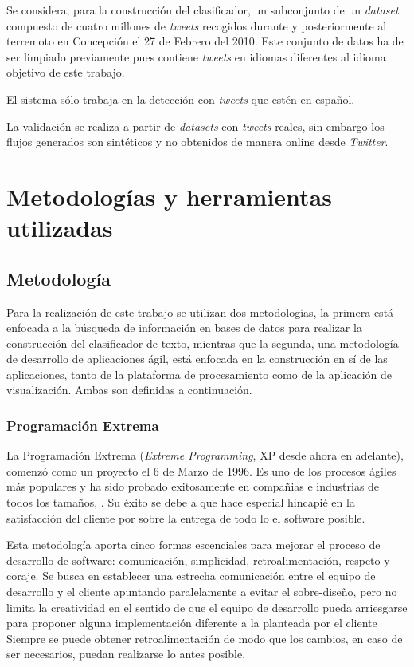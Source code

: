 Se considera, para la construcción del clasificador, un subconjunto de un \textit{dataset} compuesto de cuatro millones de \textit{tweets} recogidos durante y posteriormente al terremoto en Concepción el 27 de Febrero del 2010. Este conjunto de datos ha de ser limpiado previamente pues contiene \textit{tweets} en idiomas diferentes al idioma objetivo de este trabajo.

El sistema sólo trabaja en la detección con \textit{tweets} que estén en español.

La validación se realiza a partir de \textit{datasets} con \textit{tweets} reales, sin embargo los flujos generados son sintéticos y no obtenidos de manera online desde \textit{Twitter}.

\section{Metodologías y herramientas utilizadas}
\label{intro:metodologia}

\subsection{Metodología}
\label{subsec:MetodologiaDetalle}

Para la realización de este trabajo se utilizan dos metodologías, la primera está enfocada a la búsqueda de información en bases de datos para realizar la construcción del clasificador de texto, mientras que la segunda, una metodología de desarrollo de aplicaciones ágil, está enfocada en la construcción en sí de las aplicaciones, tanto de la plataforma de procesamiento como de la aplicación de visualización. Ambas son definidas a continuación.

\subsubsection*{Programación Extrema}
\label{subsubsec:XP}

La Programación Extrema (\textit{Extreme Programming}, XP desde ahora en adelante), comenzó como un proyecto el 6 de Marzo de 1996. Es uno de los procesos ágiles más populares y ha sido probado exitosamente en compañias e industrias de todos los tamaños, \cite{XP}. Su éxito se debe a que hace especial hincapié en la satisfacción del cliente por sobre la entrega de todo lo el software posible.

Esta metodología aporta cinco formas escenciales para mejorar el proceso de desarrollo de software: comunicación, simplicidad, retroalimentación, respeto y coraje. Se busca en establecer una estrecha comunicación entre el equipo de desarrollo y el cliente apuntando paralelamente a evitar el sobre-diseño, pero no limita la creatividad en el sentido de que el equipo de desarrollo pueda arriesgarse para proponer alguna implementación diferente a la planteada por el cliente Siempre se puede obtener retroalimentación de modo que los cambios, en caso de ser necesarios, puedan realizarse lo antes posible. 

